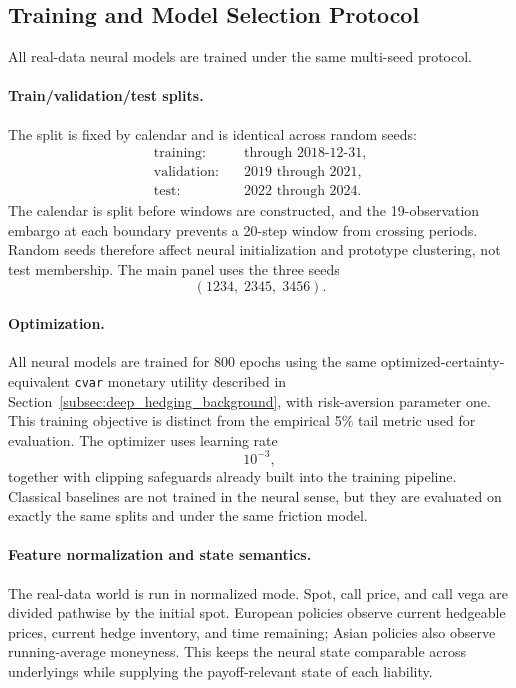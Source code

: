 \documentclass[sigconf]{acmart}
\begin{document}
\subsection{Training and Model Selection Protocol}
\label{subsec:training_protocol}

All real-data neural models are trained under the same multi-seed protocol.

\paragraph{Train/validation/test splits.}
The split is fixed by calendar and is identical across random seeds:
\[
\begin{aligned}
\text{training:} &\quad \text{through 2018-12-31},\\
\text{validation:} &\quad \text{2019 through 2021},\\
\text{test:} &\quad \text{2022 through 2024}.
\end{aligned}
\]
The calendar is split before windows are constructed, and the 19-observation
embargo at each boundary prevents a 20-step window from crossing periods.
Random seeds therefore affect neural initialization and prototype clustering,
not test membership. The main panel uses the three seeds
\[
(1234,\;2345,\;3456).
\]

\paragraph{Optimization.}
All neural models are trained for 800 epochs using the same
optimized-certainty-equivalent \texttt{cvar} monetary utility described in
Section~\ref{subsec:deep_hedging_background}, with risk-aversion parameter
one. This training objective is distinct from the empirical 5\% tail metric
used for evaluation. The optimizer uses learning rate
\[
10^{-3},
\]
together with clipping safeguards already built into the training pipeline. Classical baselines are not trained in the neural sense, but they are evaluated on exactly the same splits and under the same friction model.

\paragraph{Feature normalization and state semantics.}
The real-data world is run in normalized mode. Spot, call price, and call vega are divided pathwise by the initial spot. European policies observe current hedgeable prices, current hedge inventory, and time remaining; Asian policies also observe running-average moneyness. This keeps the neural state comparable across underlyings while supplying the payoff-relevant state of each liability.
\end{document}
